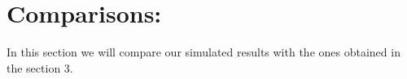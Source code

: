 \section{Comparisons:}

In this section we will compare our simulated results with the ones obtained in the section 3.